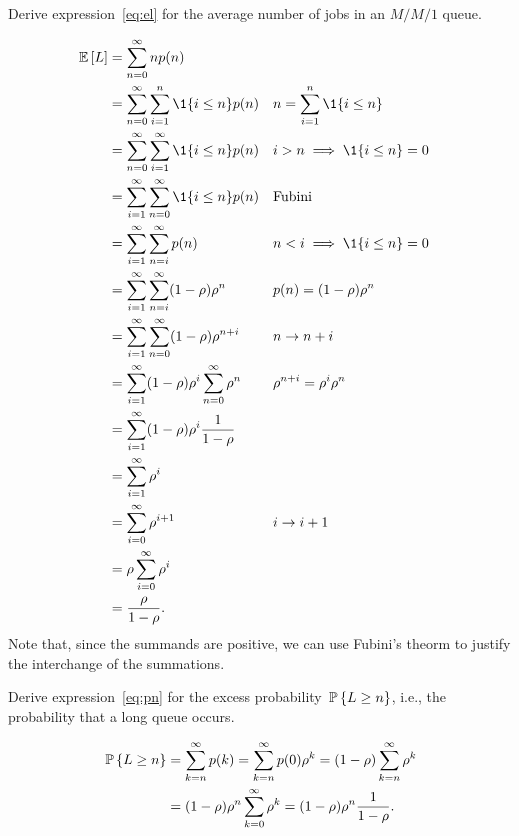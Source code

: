 \begin{question}
  Derive expression~\ref{eq:el} for the average number of jobs in an
  $M/M/1$ queue.  
  \begin{solution}
\begin{align*}
\E L &= \sum_{n=0}^\infty n p(n) \\
&= \sum_{n=0}^\infty \sum_{i=1}^n \1{i\leq n} p(n)  && n=\sum_{i=1}^n \1{i\leq n}\\
&= \sum_{n=0}^\infty \sum_{i=1}^\infty   \1{i\leq n} p(n)  && i>n\implies \1{i\leq n} = 0\\
&= \sum_{i=1}^\infty \sum_{n=0}^\infty  \1{i\leq n} p(n) &&\text{Fubini} \\
&= \sum_{i=1}^\infty \sum_{n=i}^\infty p(n) && n < i \implies \1{i\leq n}=0 \\
&= \sum_{i=1}^\infty \sum_{n=i}^\infty (1-\rho)\rho^n && p(n) = (1-\rho)\rho^n \\
&= \sum_{i=1}^\infty \sum_{n=0}^\infty (1-\rho)\rho^{n+i} && n\to n+i \\
&= \sum_{i=1}^\infty (1-\rho)\rho^i \sum_{n=0}^\infty \rho^n && \rho^{n+i}=\rho^i \rho^n\\
&= \sum_{i=1}^\infty (1-\rho)\rho^i \frac1{1-\rho}   \\
&= \sum_{i=1}^\infty \rho^i \\
&= \sum_{i=0}^\infty \rho^{i+1} && i\to i+1\\
&= \rho \sum_{i=0}^\infty \rho^i \\
&= \frac{\rho}{1-\rho}.
\end{align*}
Note that, since the summands are positive, we can use Fubini's theorm
to justify the interchange of the summations.

  \end{solution}
\end{question}

\begin{question}
  Derive expression~\ref{eq:pn} for the excess probability $\P{L\geq n}$, i.e., the probability that a long queue occurs. 
  \begin{solution}
    \begin{equation*}
      \begin{split}
 \P{L\geq n} 
 &= \sum_{k=n}^\infty p(k) = \sum_{k=n}^\infty p(0)\rho^k = (1-\rho)\sum_{k=n}^\infty \rho^k \\
 &= (1-\rho)\rho^n \sum_{k=0}^\infty\rho^k = (1-\rho) \rho^n \frac1{1-\rho}.
\end{split}
\end{equation*}
\end{solution}
\end{question}


